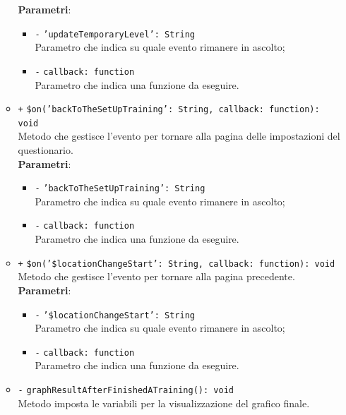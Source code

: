 \begin{itemize}
\begin{itemize}
		\textbf{Parametri}:
		\begin{itemize}
			\item \texttt{-} \texttt{'updateTemporaryLevel': String} \\
			Parametro che indica su quale evento rimanere in ascolto;
			\item \texttt{-} \texttt{callback: function} \\
			Parametro che indica una funzione da eseguire.
		\end{itemize}
		\item \texttt{+} \texttt{\$on('backToTheSetUpTraining': String, callback: function): void} \\
		Metodo che gestisce l'evento per tornare alla pagina delle impostazioni del questionario. \\
		\textbf{Parametri}:
		\begin{itemize}
			\item \texttt{-} \texttt{'backToTheSetUpTraining': String} \\
			Parametro che indica su quale evento rimanere in ascolto;
			\item \texttt{-} \texttt{callback: function} \\
			Parametro che indica una funzione da eseguire.
		\end{itemize}
		\item \texttt{+} \texttt{\$on('\$locationChangeStart': String, callback: function): void} \\
		Metodo che gestisce l'evento per tornare alla pagina precedente. \\
		\textbf{Parametri}:
		\begin{itemize}
			\item \texttt{-} \texttt{'\$locationChangeStart': String} \\
			Parametro che indica su quale evento rimanere in ascolto;
			\item \texttt{-} \texttt{callback: function} \\
			Parametro che indica una funzione da eseguire.
		\end{itemize}
		\item \texttt{-} \texttt{graphResultAfterFinishedATraining(): void} \\
		Metodo imposta le variabili per la visualizzazione del grafico finale. 
		
		
	\end{itemize}
\end{itemize}

